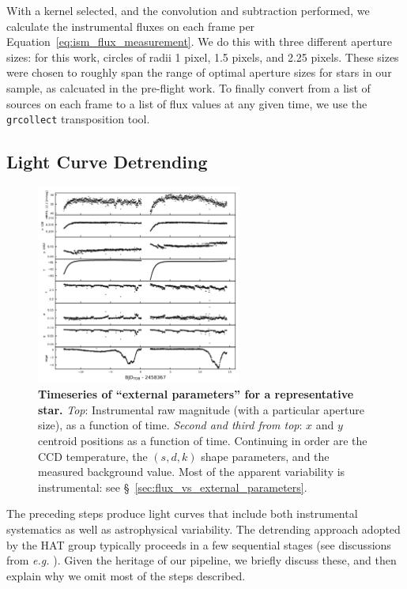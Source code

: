 \documentclass[12pt,twocolumn,tighten]{aastex62}
\begin{document}
With a kernel selected, and the convolution and subtraction performed, 
we calculate the instrumental fluxes on each frame per 
Equation~\ref{eq:ism_flux_measurement}. 
We do this with three different aperture sizes: for this work, circles
of radii 1 pixel, 1.5 pixels, and 2.25 pixels.
These sizes were chosen to roughly span the range of optimal aperture
sizes for stars in our sample, as calcuated in the pre-flight
\citet{Sullivan_et_al_2015} work.
To finally convert from a list of 
sources on each frame to a list of flux values at any given time, we use the 
\texttt{grcollect} transposition tool.

\subsection{Light Curve Detrending}
\label{subsec:lcdetrending}

\begin{figure}[t]
	\begin{center}
		\leavevmode
		\includegraphics[width=0.6\textwidth]{epdparams_vs_time.png}
	\end{center}
	\vspace{-0.5cm}
	\caption{
		{\bf Timeseries of ``external parameters'' for a representative
			star.} {\it Top}: Instrumental raw magnitude (with a particular
		aperture size), as a function of time.  {\it Second and third from
			top}: $x$ and $y$ centroid positions as a function of time.
		Continuing in order are the CCD temperature, the $(s,d,k)$ shape
		parameters, and the measured background value.
		Most of the apparent variability is instrumental: see
		\S~\ref{sec:flux_vs_external_parameters}.
		\label{fig:external_parameter_timeseries}
	}
\end{figure}

The preceding steps produce light curves that include both instrumental
systematics as well as astrophysical variability.  The detrending
approach adopted by the HAT group typically proceeds in a few
sequential stages (see discussions from {\it e.g.}
\citealt{bakos_2010,huang_high-precision_2015,zhang_precision_2016}).
Given the heritage of our pipeline, we briefly discuss these, and then
explain why we omit most of the steps described.
\end{document}
